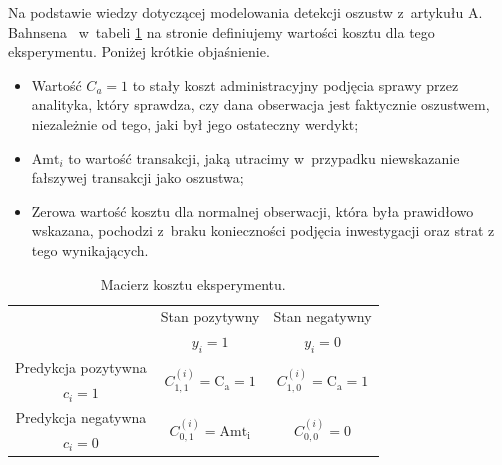 \documentclass[inzynierska]{pwr_wmat_praca_dyplomowa}
\theoremstyle{plain}
\numberwithin{theorem}{chapter}
\theoremstyle{definition}
\numberwithin{theorem}{chapter}
\begin{document}
Na podstawie wiedzy dotyczącej modelowania detekcji oszustw z~artykułu A. Bahnsena~\cite{alej2015ensemble} w~tabeli \ref{tab:macierz-kosztu-eksperyment} na stronie \pageref{tab:macierz-kosztu-eksperyment} definiujemy wartości kosztu dla tego eksperymentu. Poniżej krótkie objaśnienie.
\begin{itemize}
	\item Wartość $C_a = 1$ to stały koszt administracyjny podjęcia sprawy przez analityka, który sprawdza, czy dana obserwacja jest faktycznie oszustwem, niezależnie od tego, jaki był jego ostateczny werdykt;
	\item $\text{Amt}_i$ to wartość transakcji, jaką utracimy w~przypadku niewskazanie fałszywej transakcji jako oszustwa;
	\item Zerowa wartość kosztu dla normalnej obserwacji, która była prawidłowo wskazana, pochodzi z~braku konieczności podjęcia inwestygacji oraz strat z tego wynikających.
\end{itemize} 

\begin{table}[h]
	\begin{center}
		\begin{tabular}{c|c|c}
			\multirow{2}{4em}{} & Stan pozytywny & Stan negatywny \\
			& $y_i = 1$            & $y_i = 0$ \\
			\hline
			Predykcja pozytywna & \multirow{2}{8em}{\centering $C^{(i)}_{1,1} = \text{C}_{\text{a}} = 1$} & \multirow{2}{8em}{\centering $C^{(i)}_{1,0} = \text{C}_{\text{a}} = 1$} \\
			$c_i = 1$         &                    &                    \\
			\hline
			Predykcja negatywna & \multirow{2}{8em}{\centering $C^{(i)}_{0,1} = \text{Amt}_{\text{i}}$} & \multirow{2}{8em}{\centering $C^{(i)}_{0,0} = 0$} \\
			$c_i = 0$         &                    &                    \\
		\end{tabular}
	\end{center}
	\caption{Macierz kosztu eksperymentu.}
	\label{tab:macierz-kosztu-eksperyment}
\end{table}
\end{document}
